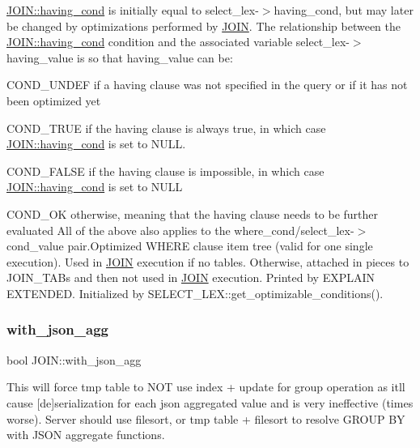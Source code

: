 \mbox{\hyperlink{classJOIN_a69dc26a844c4680287a0a5281881073a}{J\+O\+I\+N\+::having\+\_\+cond}} is initially equal to select\+\_\+lex-\/$>$having\+\_\+cond, but may later be changed by optimizations performed by \mbox{\hyperlink{classJOIN}{J\+O\+IN}}. The relationship between the \mbox{\hyperlink{classJOIN_a69dc26a844c4680287a0a5281881073a}{J\+O\+I\+N\+::having\+\_\+cond}} condition and the associated variable select\+\_\+lex-\/$>$having\+\_\+value is so that having\+\_\+value can be\+:
\begin{DoxyItemize}
\item C\+O\+N\+D\+\_\+\+U\+N\+D\+EF if a having clause was not specified in the query or if it has not been optimized yet
\item C\+O\+N\+D\+\_\+\+T\+R\+UE if the having clause is always true, in which case \mbox{\hyperlink{classJOIN_a69dc26a844c4680287a0a5281881073a}{J\+O\+I\+N\+::having\+\_\+cond}} is set to N\+U\+LL.
\item C\+O\+N\+D\+\_\+\+F\+A\+L\+SE if the having clause is impossible, in which case \mbox{\hyperlink{classJOIN_a69dc26a844c4680287a0a5281881073a}{J\+O\+I\+N\+::having\+\_\+cond}} is set to N\+U\+LL
\item C\+O\+N\+D\+\_\+\+OK otherwise, meaning that the having clause needs to be further evaluated All of the above also applies to the where\+\_\+cond/select\+\_\+lex-\/$>$cond\+\_\+value pair.\+Optimized W\+H\+E\+RE clause item tree (valid for one single execution). Used in \mbox{\hyperlink{classJOIN}{J\+O\+IN}} execution if no tables. Otherwise, attached in pieces to J\+O\+I\+N\+\_\+\+T\+A\+Bs and then not used in \mbox{\hyperlink{classJOIN}{J\+O\+IN}} execution. Printed by E\+X\+P\+L\+A\+IN E\+X\+T\+E\+N\+D\+ED. Initialized by S\+E\+L\+E\+C\+T\+\_\+\+L\+E\+X\+::get\+\_\+optimizable\+\_\+conditions(). 
\end{DoxyItemize}\mbox{\label{classJOIN_a82f34e62a218c8ac3871e0dd32ccc8a3}} 
\subsubsection{\texorpdfstring{with\+\_\+json\+\_\+agg}{with\_json\_agg}}
{\footnotesize\ttfamily bool J\+O\+I\+N\+::with\+\_\+json\+\_\+agg}

This will force tmp table to N\+OT use index + update for group operation as it\textquotesingle{}ll cause \mbox{[}de\mbox{]}serialization for each json aggregated value and is very ineffective (times worse). Server should use filesort, or tmp table + filesort to resolve G\+R\+O\+UP BY with J\+S\+ON aggregate functions. 

